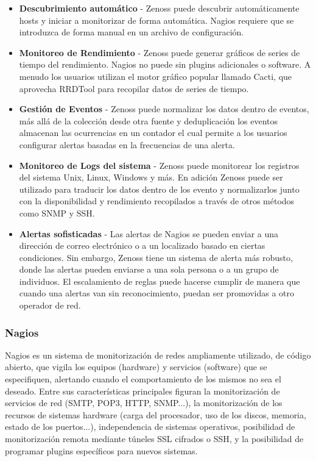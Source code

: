 \begin{itemize}
\item \textbf{Descubrimiento automático} - Zenoss puede descubrir
  automáticamente hosts y iniciar a monitorizar de forma
  automática. Nagios requiere que se introduzca de forma manual en
  un archivo de configuración.
\item \textbf{Monitoreo de Rendimiento} - Zenoss puede generar gráficos de
  series de tiempo del rendimiento. Nagios no puede sin plugins
  adicionales o software. A menudo los usuarios utilizan el motor
  gráfico popular llamado Cacti, que aprovecha RRDTool para
  recopilar datos de series de tiempo.
\item \textbf{Gestión de Eventos} - Zenoss puede normalizar los
  datos dentro de eventos, más allá de la colección desde otra
  fuente y deduplicación los eventos almacenan las ocurrencias en un
  contador el cual permite a los usuarios configurar alertas basadas en
  la frecuencias de una alerta.
\item \textbf{Monitoreo de Logs del sistema} - Zenoss puede monitorear
  los registros del sistema Unix, Linux, Windows y más. En adición
  Zenoss puede ser utilizado para traducir los datos dentro de los
  evento y normalizarlos junto con la disponibilidad y rendimiento
  recopilados a través de otros métodos como SNMP y SSH.
\item \textbf{Alertas sofisticadas} - Las alertas de Nagios se pueden
  enviar a una dirección de correo electrónico o a un localizado
  basado en ciertas condiciones. Sin embargo, Zenoss tiene un sistema
  de alerta más robusto, donde las alertas pueden enviarse a una
  sola persona o a un grupo de individuos. El escalamiento de reglas
  puede hacerse cumplir de manera que cuando una alertas van sin
  reconocimiento, puedan ser promovidas a otro operador de red.
\end{itemize}

\subsubsection{Nagios}

Nagios es un sistema de monitorización de redes ampliamente utilizado, de código abierto, que vigila los equipos (hardware) y servicios (software) que se especifiquen, alertando cuando el comportamiento de los mismos no sea el deseado. Entre sus características principales figuran la monitorización de servicios de red (SMTP, POP3, HTTP, SNMP...), la monitorización de los recursos de sistemas hardware (carga del procesador, uso de los discos, memoria, estado de los puertos...), independencia de sistemas operativos, posibilidad de monitorización remota mediante túneles SSL cifrados o SSH, y la posibilidad de programar plugins específicos para nuevos sistemas.

